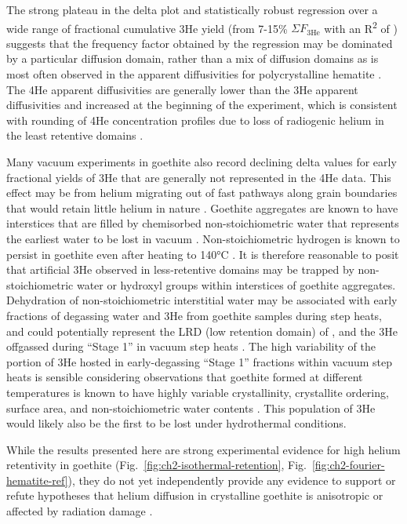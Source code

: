The strong plateau in the delta plot and statistically robust regression
over a wide range of fractional cumulative 3He yield (from 7-15\% $\Sigma F_{3\mathrm{He}}$
with an R\textsuperscript{2} of \ChTwoRtwo) suggests that the frequency
factor obtained by the regression may be dominated by a particular
diffusion domain, rather than a mix of diffusion domains as is most
often observed in the apparent diffusivities for polycrystalline
hematite \citep{farley2018}. The 4He apparent diffusivities are generally
lower than the 3He apparent diffusivities and increased at the beginning
of the experiment, which is consistent with rounding of 4He
concentration profiles due to loss of radiogenic helium in the least
retentive domains \citep{shuster2004,shustervasconcelos2005}.

Many vacuum experiments in goethite also record declining delta values
for early fractional yields of 3He \citep{shustervasconcelos2005,farley2024} that are generally not represented in the 4He data. This effect
may be from helium migrating out of fast pathways along grain boundaries
that would retain little helium in nature \citep{shustervasconcelos2005}.
Goethite aggregates are known to have interstices that are filled by
chemisorbed non-stoichiometric water that represents the earliest water
to be lost in vacuum \citep{naono1987}. Non-stoichiometric hydrogen
is known to persist in goethite even after heating to 140°C \citep{yapppoths1995}. It is therefore reasonable to posit that artificial 3He
observed in less-retentive domains may be trapped by non-stoichiometric
water or hydroxyl groups within interstices of goethite aggregates.
Dehydration of non-stoichiometric interstitial water may be associated
with early fractions of degassing water and 3He from goethite samples
during step heats, and could potentially represent the LRD (low retention
domain) of \citet{shustervasconcelos2005}, and the 3He offgassed during ``Stage
1'' in vacuum step heats \citep{farley2024}. The high variability of
the portion of 3He hosted in early-degassing ``Stage 1'' fractions
within vacuum step heats is sensible considering observations that
goethite formed at different temperatures is known to have highly
variable crystallinity, crystallite ordering, surface area, and
non-stoichiometric water contents \citep{schwertmann1985}. This
population of 3He would likely also be the first to be lost under
hydrothermal conditions.

While the results presented here are strong experimental evidence for
high helium retentivity in goethite (Fig.~\ref{fig:ch2-isothermal-retention}, Fig.~\ref{fig:ch2-fourier-hematite-ref}), they do not yet
independently provide any evidence to support or refute hypotheses that
helium diffusion in crystalline goethite is anisotropic or affected by
radiation damage \citep{bassal2022}.

